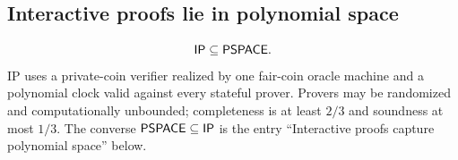 \begin{result}
\subsection{Interactive proofs lie in polynomial space}
\[
\mathsf{IP}\subseteq\mathsf{PSPACE}.
\]
IP uses a private-coin verifier realized by one fair-coin oracle machine and a
polynomial clock valid against every stateful prover. Provers may be randomized
and computationally unbounded; completeness is at least $2/3$ and soundness at
most $1/3$. The converse $\mathsf{PSPACE}\subseteq\mathsf{IP}$ is the entry ``Interactive proofs capture
polynomial space'' below.
\citep[Chapter 8]{AroraBarak09}
\end{result}

